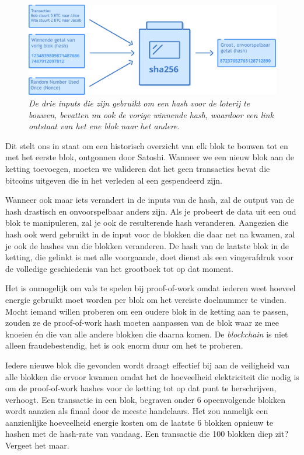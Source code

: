 \begin{figure}
    \centering
    \includegraphics[width=\textwidth]{images/fig11.png}
    \caption{\footnotesize{\textit{De drie inputs die zijn gebruikt om een hash voor de loterij te bouwen, bevatten nu ook de vorige winnende hash, waardoor een link ontstaat van het ene blok naar het andere.}}}
    \label{fig11}
\end{figure}


Dit stelt ons in staat om een historisch overzicht van elk blok te bouwen tot en met het eerste blok, ontgonnen door Satoshi. Wanneer we een nieuw blok aan de ketting toevoegen, moeten we valideren dat het geen transacties bevat die bitcoins uitgeven die in het verleden al een gespendeerd zijn.

Wanneer ook maar iets verandert in de inputs van de hash, zal de output van de hash drastisch en onvoorspelbaar anders zijn. Als je probeert de data uit een oud blok te manipuleren, zal je ook de resulterende hash veranderen. Aangezien die hash ook werd gebruikt in de input voor de blokken die daar net na kwamen, zal je ook de hashes van die blokken veranderen. De hash van de laatste blok in de ketting, die gelinkt is met alle voorgaande, doet dienst als een vingerafdruk voor de volledige geschiedenis van het grootboek tot op dat moment.

Het is onmogelijk om vals te spelen bij proof-of-work omdat iederen weet hoeveel energie gebruikt moet worden per blok om het vereiste doelnummer te vinden. Mocht iemand willen proberen om een oudere blok in de ketting aan te passen, zouden ze de proof-of-work hash moeten aanpassen van de blok waar ze mee knoeien én die van alle andere blokken die daarna komen. De \textit{blockchain} is niet alleen fraudebestendig, het is ook enorm duur om het te proberen.

Iedere nieuwe blok die gevonden wordt draagt effectief bij aan de veiligheid van alle blokken die ervoor kwamen omdat het de hoeveelheid elektriciteit die nodig is om de proof-of-work hashes voor de ketting tot op dat punt te herschrijven, verhoogt. Een transactie in een blok, begraven onder 6 opeenvolgende blokken wordt aanzien als finaal door de meeste handelaars. Het zou namelijk een aanzienlijke hoeveelheid energie kosten om de laatste 6 blokken opnieuw te hashen met de hash-rate van vandaag. Een transactie die 100 blokken diep zit? Vergeet het maar.

